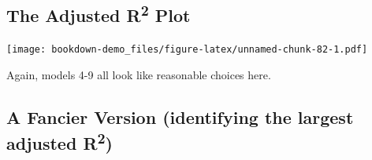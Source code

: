 \documentclass[]{book}
\newenvironment{Shaded}{\begin{snugshade}}{\end{snugshade}}
\newcommand{\KeywordTok}[1]{\textcolor[rgb]{0.13,0.29,0.53}{\textbf{#1}}}
\newcommand{\DataTypeTok}[1]{\textcolor[rgb]{0.13,0.29,0.53}{#1}}
\newcommand{\DecValTok}[1]{\textcolor[rgb]{0.00,0.00,0.81}{#1}}
\newcommand{\StringTok}[1]{\textcolor[rgb]{0.31,0.60,0.02}{#1}}
\newcommand{\OperatorTok}[1]{\textcolor[rgb]{0.81,0.36,0.00}{\textbf{#1}}}
\newcommand{\NormalTok}[1]{#1}
\theoremstyle{definition}
\theoremstyle{definition}
\theoremstyle{definition}
\theoremstyle{remark}
\begin{document}
\subsection{\texorpdfstring{The Adjusted R\textsuperscript{2}
Plot}{The Adjusted R2 Plot}}\label{the-adjusted-r2-plot-1}

\begin{Shaded}
\end{Shaded}

\texttt{[image: bookdown-demo\_files/figure-latex/unnamed-chunk-82-1.pdf]}

Again, models 4-9 all look like reasonable choices here.

\subsection{\texorpdfstring{A Fancier Version (identifying the largest
adjusted
R\textsuperscript{2})}{A Fancier Version (identifying the largest adjusted R2)}}\label{a-fancier-version-identifying-the-largest-adjusted-r2}
\end{document}
